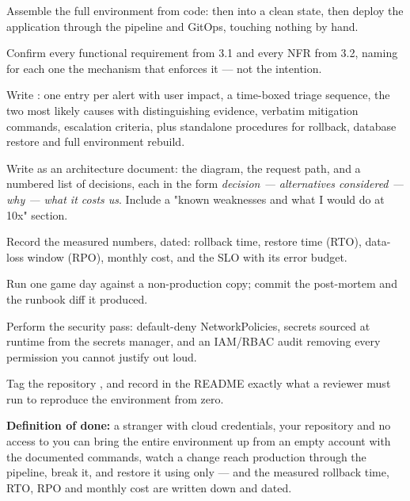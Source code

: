 \begin{buildalong}
\begin{wbitem}
  \item Assemble the full environment from code:  then  into a clean state, then deploy the application through the pipeline and GitOps, touching nothing by hand.
  \item Confirm every functional requirement from 3.1 and every NFR from 3.2, naming for each one the mechanism that enforces it --- not the intention.
  \item Write : one entry per alert with user impact, a time-boxed triage sequence, the two most likely causes with distinguishing evidence, verbatim mitigation commands, escalation criteria, plus standalone procedures for rollback, database restore and full environment rebuild.
  \item Write  as an architecture document: the diagram, the request path, and a numbered list of decisions, each in the form \emph{decision --- alternatives considered --- why --- what it costs us}. Include a "known weaknesses and what I would do at 10x" section.
  \item Record the measured numbers, dated: rollback time, restore time (RTO), data-loss window (RPO), monthly cost, and the SLO with its error budget.
  \item Run one game day against a non-production copy; commit the post-mortem and the runbook diff it produced.
  \item Perform the security pass: default-deny NetworkPolicies, secrets sourced at runtime from the secrets manager, and an IAM/RBAC audit removing every permission you cannot justify out loud.
  \item Tag the repository , and record in the README exactly what a reviewer must run to reproduce the environment from zero.
\end{wbitem}
\smallskip\textbf{Definition of done:} a stranger with cloud credentials, your repository and no access to you can bring the entire environment up from an empty account with the documented commands, watch a change reach production through the pipeline, break it, and restore it using only  --- and the measured rollback time, RTO, RPO and monthly cost are written down and dated.
\end{buildalong}

